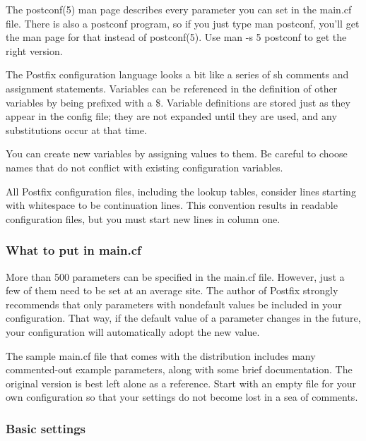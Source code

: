 The {postconf}(5) man page describes every parameter you can set in the
{main.cf} file. There is also a {postconf} program, so if you just type
{man postconf}, you'll get the man page for that instead of
{postconf}(5). Use {man -s 5 postconf} to get the right version.

The Postfix configuration language looks a bit like a series of {sh}
comments and assignment statements. Variables can be referenced in the
definition of other variables by being prefixed with a {\$}. Variable
definitions are stored just as they appear in the config file; they are
not expanded until they are used, and any substitutions occur at that
time.

You can create new variables by assigning values to them. Be careful to
choose names that do not conflict with existing configuration variables.

All Postfix configuration files, including the lookup tables, consider
lines starting with whitespace to be continuation lines. This convention
results in readable configuration files, but you must start new lines in
column one.

\subsubsection[What to put in
{main.cf}]{\texorpdfstring{\protect\hypertarget{part0026_split_061.htmlux5cux23_idTextAnchor1173}{}{}What
to put in {main.cf}}{What to put in main.cf}}

More than 500 parameters can be specified in the {main.cf} file.
However, just a few of them need to be set at an average site. The
author of Postfix strongly recommends that only parameters with
nondefault values be included in your configuration. That way, if the
default value of a parameter changes in the future, your configuration
will automatically adopt the new value.

The sample {main.cf} file that comes with the distribution includes many
{commented}-out example parameters, along with some brief documentation.
The original version is best left alone as a reference. Start with an
empty file for your own configuration so that your settings do not
become lost in a sea of comments.

\subsubsection[Basic
settings]{\texorpdfstring{\protect\hypertarget{part0026_split_061.htmlux5cux23_idTextAnchor1174}{}{}Basic
settings}{Basic settings}}

